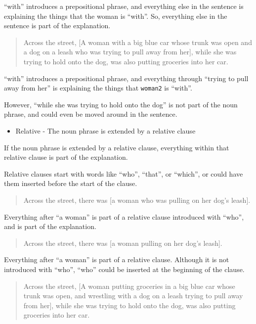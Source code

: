 \documentclass[
]{book}
\providecommand{\tightlist}{%
  \setlength{\itemsep}{0pt}\setlength{\parskip}{0pt}}
\begin{document}
``with'' introduces a prepositional phrase,
and everything else in the sentence
is explaining the things that the woman is ``with''.
So, everything else in the sentence is part of the explanation.

\begin{quote}
Across the street,
{[}A woman with a big blue car whose trunk was open
and a dog on a leash who was trying to pull away from her{]},
while she was trying to hold onto the dog,
was also putting groceries into her car.
\end{quote}

``with'' introduces a prepositional phrase,
and everything through ``trying to pull away from her''
is explaining the things that \texttt{woman2} is ``with''.

However, ``while she was trying to hold onto the dog''
is not part of the noun phrase,
and could even be moved around in the sentence.

\begin{itemize}
\tightlist
\item
  Relative - The noun phrase is extended by a relative clause
\end{itemize}

If the noun phrase is extended by a relative clause,
everything within that relative clause is part of the explanation.

Relative clauses start with words like ``who'', ``that'', or ``which'',
or could have them inserted before the start of the clause.

\begin{quote}
Across the street,
there was {[}a woman who was pulling on her dog's leash{]}.
\end{quote}

Everything after ``a woman''
is part of a relative clause introduced with ``who'',
and is part of the explanation.

\begin{quote}
Across the street,
there was {[}a woman pulling on her dog's leash{]}.
\end{quote}

Everything after ``a woman'' is part of a relative clause.
Although it is not introduced with ``who'',
``who'' could be inserted at the beginning of the clause.

\begin{quote}
Across the street,
{[}A woman putting groceries in a big blue car whose trunk was open,
and wrestling with a dog on a leash trying to pull away from her{]},
while she was trying to hold onto the dog,
was also putting groceries into her car.
\end{quote}
\end{document}
